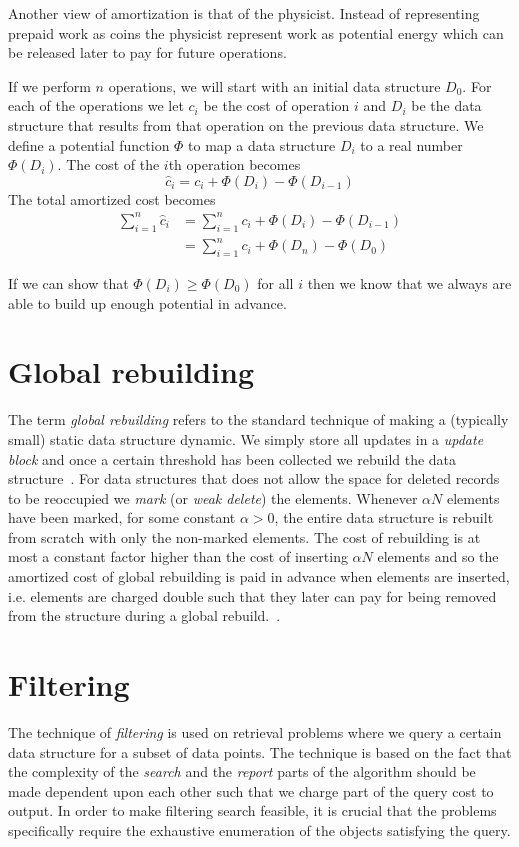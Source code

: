 \documentclass[twoside,11pt,openright]{report}
\begin{document}
Another view of amortization is that of the physicist. Instead of representing prepaid work as coins the physicist represent work as potential energy which can be released later to pay for future operations.

If we perform $n$ operations, we will start with an initial data structure $D_0$. For each of the operations we let $c_i$ be the cost of operation $i$ and $D_i$ be the data structure that results from that operation on the previous data structure. We define a potential function $\Phi$ to map a data structure $D_i$ to a real number $\Phi(D_i)$. The cost of the $i$th operation becomes
$$\hat{c}_i = c_i + \Phi(D_i) - \Phi(D_{i-1})$$
The total amortized cost becomes
\begin{align*}
\sum_{i=1}^n \hat{c}_i &= \sum_{i=1}^n c_i + \Phi(D_i) - \Phi(D_{i-1}) \\
&= \sum_{i=1}^n c_i + \Phi(D_n) - \Phi(D_{0})
\end{align*}

If we can show that $\Phi(D_i) \geq \Phi(D_0)$ for all $i$ then we know that we always are able to build up enough potential in advance.

\section{Global rebuilding}
\label{sec:prelim_global_rebuilding}
The term \textit{global rebuilding} refers to the standard technique of making a (typically small) static data structure dynamic. We simply store all updates in a \textit{update block} and once a certain threshold has been collected we rebuild the data structure~\cite{ionote}. For data structures that does not allow the space for deleted records to be reoccupied we \textit{mark} (or \textit{weak delete}) the elements. Whenever $\alpha N$ elements have been marked, for some constant $\alpha > 0$, the entire data structure is rebuilt from scratch with only the non-marked elements. The cost of rebuilding is at most a constant factor higher than the cost of inserting $\alpha N$ elements and so the amortized cost of global rebuilding is paid in advance when elements are inserted, i.e. elements are charged double such that they later can pay for being removed from the structure during a global rebuild.~\cite{Meyer:2003/AMH/1744652}.

\section{Filtering}
\label{sec:filtering}
The technique of \textit{filtering} is used on retrieval problems where we query a certain data structure for a subset of data points. The technique is based on the fact that the complexity of the \textit{search} and the \textit{report} parts of the algorithm should be made dependent upon each other such that we charge part of the query cost to output. In order to make filtering search feasible, it is crucial that the problems specifically require the exhaustive enumeration of the objects satisfying the query.
\end{document}
